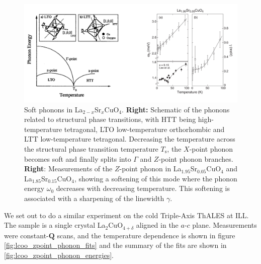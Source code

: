 \begin{figure}[]
    \centering
    \includegraphics[width=\textwidth]{fig/lowen/soft_phonons.png}
    \caption{Soft phonons in La$_{2-x}$Sr$_x$CuO$_4$. \textbf{Right:} Schematic of the phonons related to structural phase transitions, with HTT being high-temperature tetragonal, LTO low-temperature orthorhombic and LTT low-temperature tetragonal. Decreasing the temperature across the structural phase transition temperature $T_\text{s}$, the $X$-point phonon becomes soft and finally splits into $\Gamma$ and $Z$-point phonon branches. \textbf{Right}: Measurements of the $Z$-point phonon in La$_{1.95}$Sr$_{0.05}$CuO$_4$ and La$_{1.85}$Sr$_{0.15}$CuO$_4$, showing a softening of this mode where the phonon energy $\omega_0$ decreases with decreasing temperature. This softening is associated with a sharpening of the linewidth $\gamma$.}
    \label{fig:soft_phonons_summary}
\end{figure}

We set out to do a similar experiment on the cold Triple-Axis ThALES at ILL. The sample is a single crystal La$_2$CuO$_{4+\delta}$ aligned in the $a$-$c$ plane. Measurements were constant-$\bm{Q}$ scans, and the temperature dependence is shown in figure \ref{fig:lcoo_zpoint_phonon_fits} and the summary of the fits are shown in \ref{fig:lcoo_zpoint_phonon_energies}.


